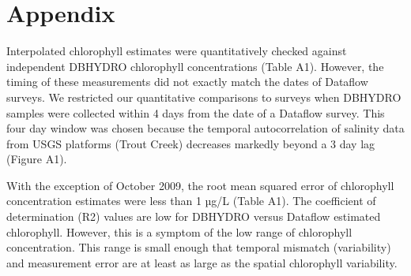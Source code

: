 
\author{Joseph Stachelek         \and
        Christopher Madden  \and
        Stephen Kelly \and
        Michelle Blaha
}



\date{Edited: 2017-02-27 / Received: date / Accepted: date}


\maketitle

\section{Appendix}

Interpolated chlorophyll estimates were quantitatively checked against independent DBHYDRO chlorophyll concentrations (Table A1). However, the timing of these measurements did not exactly match the dates of Dataflow surveys. We restricted our quantitative comparisons to surveys when DBHYDRO samples were collected within 4 days from the date of a Dataflow survey. This four day window was chosen because the temporal autocorrelation of salinity data from USGS platforms (Trout Creek) decreases markedly beyond a 3 day lag (Figure A1).

With the exception of October 2009, the root mean squared error of chlorophyll concentration estimates were less than 1 µg/L (Table A1). The coefficient of determination (R2) values are low for DBHYDRO versus Dataflow estimated chlorophyll. However, this is a symptom of the low range of chlorophyll concentration. This range is small enough that temporal mismatch (variability) and measurement error are at least as large as the spatial chlorophyll variability.

